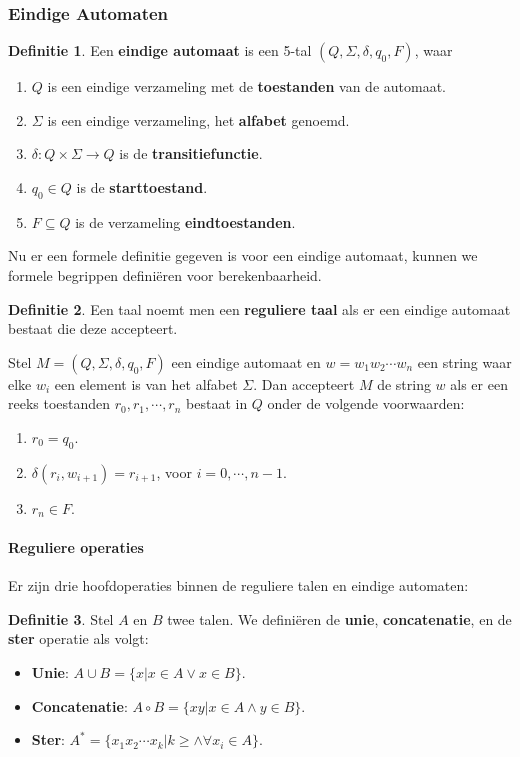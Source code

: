 \documentclass[12pt,a4paper]{article}
\theoremstyle{definition}
\newtheorem{defi}{Definitie}[section]
\newcommand{\ra}{\ensuremath{\rightarrow}}
\newcommand{\NFA}{\ensuremath{(Q,\Sigma,\delta,q_0,F)}}
\begin{document}
\subsubsection{Eindige Automaten}
	\begin{defi}
		Een \textbf{eindige automaat} is een 5-tal $(Q,\Sigma,\delta,q_0,F)$, waar
		\begin{enumerate}
			\item $Q$ is een eindige verzameling met de \textbf{toestanden} van de automaat.
			\item $\Sigma$ is een eindige verzameling, het \textbf{alfabet} genoemd.
			\item $\delta: Q\times \Sigma \ra Q$ is de \textbf{transitiefunctie}.
			\item $q_0 \in Q$ is de \textbf{starttoestand}.
			\item $F \subseteq Q$ is de verzameling \textbf{eindtoestanden}.			
		\end{enumerate}
	\end{defi}
Nu er een formele definitie gegeven is voor een eindige automaat, kunnen we formele begrippen definiëren voor berekenbaarheid.\\
	
	\begin{defi}
		Een taal noemt men een \textbf{reguliere taal} als er een eindige automaat bestaat die deze accepteert.
	\end{defi}
	Stel $M = \NFA$ een eindige automaat en $w=w_1w_2\cdots w_n$ een string waar elke $w_i$ een element is van het alfabet $\Sigma$. Dan accepteert $M$ de string $w$ als er een reeks toestanden $r_0,r_1,\cdots,r_n$ bestaat in $Q$ onder de volgende voorwaarden:
	\begin{enumerate}
		\item $r_0 = q_0$.
		\item $\delta(r_i,w_{i+1})=r_{i+1}$, voor $i=0,\cdots,n-1$.
		\item $r_n \in F$.
	\end{enumerate} 
	\paragraph{Reguliere operaties}
	Er zijn drie hoofdoperaties binnen de reguliere talen en eindige automaten:
	\begin{defi}
		Stel $A$ en $B$ twee talen. We definiëren de \textbf{unie}, \textbf{concatenatie}, en de \textbf{ster} operatie als volgt:
		\begin{itemize}
			\item \textbf{Unie}: $A\cup B=\{x|x\in A \vee x\in B\}$.
			\item \textbf{Concatenatie}: $A\circ B = \{xy|x\in A \wedge y \in B\}$.
			\item \textbf{Ster}: $A^*=\{x_1 x_2\cdots x_k | k\geq \wedge \forall x_i\in A\}$.
		\end{itemize}
	\end{defi}
\end{document}
